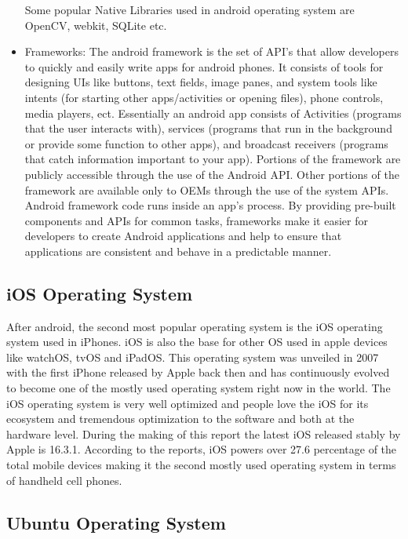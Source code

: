 \documentclass[conference]{IEEEtran}
\begin{document}
\begin{itemize}
Some popular Native Libraries used in android operating system are OpenCV, webkit, SQLite etc. 
\linebreak
\item Frameworks: \linebreak
The android framework is the set of API's that allow developers to quickly and easily write apps for android phones. It consists of tools for designing UIs like buttons, text fields, image panes, and system tools like intents (for starting other apps/activities or opening files), phone controls, media players, ect. Essentially an android app consists of Activities (programs that the user interacts with), services (programs that run in the background or provide some function to other apps), and broadcast receivers (programs that catch information important to your app). Portions of the framework are publicly accessible through the use of the Android API. Other portions of the framework are available only to OEMs through the use of the system APIs. Android framework code runs inside an app's process. By providing pre-built components and APIs for common tasks, frameworks make it easier for developers to create Android applications and help to ensure that applications are consistent and behave in a predictable manner.

\end{itemize}

\subsection{iOS Operating System}

After android, the second most popular operating system is the iOS operating system used in iPhones. iOS is also the base for other OS used in apple devices like watchOS, tvOS and iPadOS. This operating system was unveiled in 2007 with the first iPhone released by Apple back then and has continuously evolved to become one of the mostly used operating system right now in the world. The iOS operating system is very well optimized and people love the iOS for its ecosystem and tremendous optimization to the software and both at the hardware level. During the making of this report the latest iOS released stably by Apple is 16.3.1. According to the reports, iOS powers over 27.6 percentage of the total mobile devices making it the second mostly used operating system in terms of handheld cell phones. 


\subsection{Ubuntu Operating System}
\end{document}
